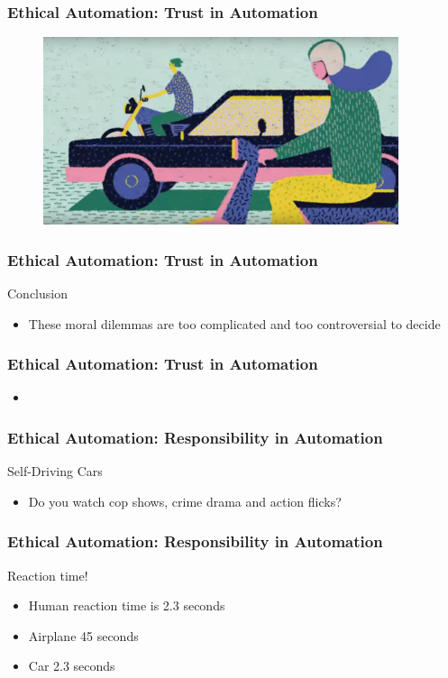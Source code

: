 \begin{frame}
	\frametitle{ Ethical Automation: Trust in Automation}
	\begin{figure}[bht]
		\centering
		\includegraphics[width=4.1in]{diagrams/image01}
		\caption{}
		\label{fig:-deg}
	\end{figure}
\end{frame}


\begin{frame}
	\frametitle{ Ethical Automation: Trust in Automation}
	{\Large Conclusion}
	\begin{itemize}
		\item These moral dilemmas are too complicated and too controversial to decide
	\end{itemize}
\end{frame}


\begin{frame}
	\frametitle{ Ethical Automation: Trust in Automation}
	\begin{itemize}
		\item
	\end{itemize}
\end{frame}


\begin{frame}
	\frametitle{ Ethical Automation: Responsibility in Automation}
	{\Large Self-Driving Cars}
	\begin{itemize}
		\item Do you watch cop shows, crime drama and action flicks?
	\end{itemize}
\end{frame}

\begin{frame}
	\frametitle{ Ethical Automation: Responsibility in Automation}
	{\Large Reaction time!}
	\begin{itemize}
		\item Human reaction time is 2.3 seconds
		\item Airplane 45 seconds
		\item Car 2.3 seconds
	\end{itemize}
\end{frame}

